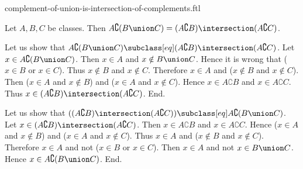 \documentclass{article}
\begin{document}
\begin{smodule}[creators={Marcel Schütz}]{complement-of-union-is-intersection-of-complements.ftl}

  \begin{fproposition*}[label=718948240719872]
    Let $A, B, C$ be classes.
    Then $A \complement (B \union C) = (A \complement B) \intersection (A \complement C)$.
  \end{fproposition*}
  \begin{fproof}
    Let us show that $A \complement (B \union C) \subclass[eq]
    (A \complement B) \intersection (A \complement C)$.
      Let $x \in A \complement (B \union C)$.
      Then $x \in A$ and $x \notin B \union C$.
      Hence it is wrong that ($x \in B$ or $x \in C$).
      Thus $x \notin B$ and $x \notin C$.
      Therefore $x \in A$ and ($x \notin B$ and $x \notin C$).
      Then ($x \in A$ and $x \notin B$) and ($x \in A$ and $x \notin C$).
      Hence $x \in A \complement B$ and $x \in A \complement C$.
      Thus $x \in (A \complement B) \intersection (A \complement C)$.
    End.

    Let us show that $((A \complement B) \intersection (A \complement C)) \subclass[eq]
    A \complement (B \union C)$. %
      Let $x \in (A \complement B) \intersection (A \complement C)$.
      Then $x \in A \complement B$ and $x \in A \complement C$.
      Hence ($x \in A$ and $x \notin B$) and ($x \in A$ and $x \notin C$).
      Thus $x \in A$ and ($x \notin B$ and $x \notin C$).
      Therefore $x \in A$ and not ($x \in B$ or $x \in C$).
      Then $x \in A$ and not $x \in B \union C$.
      Hence $x \in A \complement (B \union C)$.
    End.
  \end{fproof}
\end{smodule}
\end{document}
